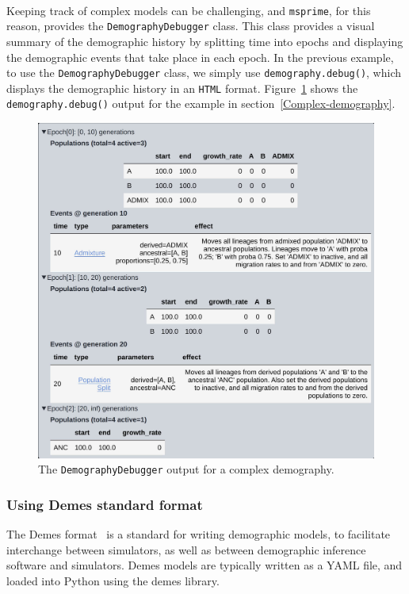 \documentclass[graybox]{svmult}
\newcommand{\msprime}[0]{\texttt{msprime}}
\begin{document}
\label{demography-debugger}\

Keeping track of complex models can be challenging, and \msprime, for this reason,
provides the \texttt{DemographyDebugger} class. This class provides a visual summary of
the demographic history by splitting time into epochs and displaying the demographic
events that take place in each epoch. In the previous example, to use the \texttt{DemographyDebugger} class,
we simply use \texttt{demography.debug()}, which displays the demographic history in an \texttt{HTML}
format. Figure~\ref{fig:DemographyDebugger} shows the \texttt{demography.debug()} output for the example in section~\ref{Complex-demography}.

\begin{figure}[t]
\centering
\includegraphics[width=\textwidth]{images/demography_debugger.pdf}
\caption{\label{fig:DemographyDebugger}The \texttt{DemographyDebugger} output for a complex demography.}
\end{figure}

\subsubsection{Using Demes standard format}\label{using-demes-standard-format}

The Demes format~\citep{gower_demes_2022} is a standard for writing
demographic models, to facilitate interchange between simulators, as well as between
demographic inference software and simulators. Demes models are typically written as a
YAML file, and loaded into Python using the demes library.
\end{document}
